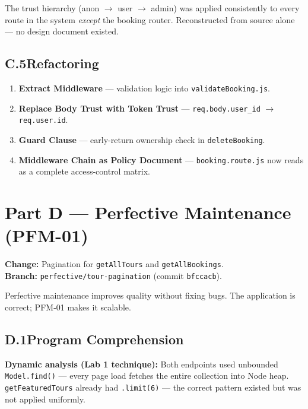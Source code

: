 \documentclass[11pt,a4paper]{article}
\begin{document}
The trust hierarchy (anon $\to$ user $\to$ admin) was applied consistently to every
route in the system \emph{except} the booking router.
Reconstructed from source alone --- no design document existed.

\subsection{C.5\quad Refactoring}

\begin{enumerate}
  \item \textbf{Extract Middleware} --- validation logic into \texttt{validateBooking.js}.
  \item \textbf{Replace Body Trust with Token Trust} ---
        \texttt{req.body.user\_id} $\to$ \texttt{req.user.id}.
  \item \textbf{Guard Clause} --- early-return ownership check in \texttt{deleteBooking}.
  \item \textbf{Middleware Chain as Policy Document} --- \texttt{booking.route.js} now
        reads as a complete access-control matrix.
\end{enumerate}

\newpage
\section{Part D --- Perfective Maintenance (PFM-01)}

\noindent\textbf{Change:} Pagination for \texttt{getAllTours} and \texttt{getAllBookings}.\\[2pt]
\textbf{Branch:} \texttt{perfective/tour-pagination} (commit \texttt{bfccacb}).

Perfective maintenance improves quality without fixing bugs.
The application is correct; PFM-01 makes it scalable.

\subsection{D.1\quad Program Comprehension}

\noindent\textbf{Dynamic analysis (Lab 1 technique):}
Both endpoints used unbounded \texttt{Model.find()} --- every page load fetches the
entire collection into Node heap.
\texttt{getFeaturedTours} already had \texttt{.limit(6)} --- the correct pattern existed
but was not applied uniformly.
\end{document}
